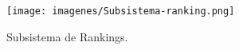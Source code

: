 \begin{figure}[H]
  \centering
  \texttt{[image: imagenes/Subsistema-ranking.png]}
  \caption{Subsistema de Rankings.}
\end{figure}
